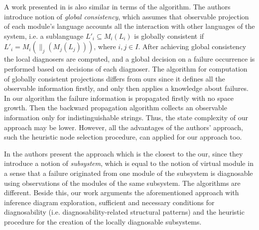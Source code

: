 A work presented in \cite{su_global_2005} is also similar in terms of the
algorithm. The authors introduce notion of \emph{global consistency}, which
assumes that observable projection of each module's language accounts all the
interaction with other languages of the system, i.e. a sublanguage 
$L'_i \subseteq M_i(L_i)$ is globally consistent if 
$L'_i = M_i(\parallel_j(M_j(L_j)))$, where $i, j \in I$. After achieving global
consistency the local diagnosers are computed, and a global decision on a
failure occurrence is performed based on decisions of each diagnoser. The
algorithm for computation of globally consistent projections differs from ours
since it defines all the observable information firstly, and only then
applies a knowledge about failures. In our algorithm the failure information is
propagated firstly with no space growth. Then the backward propagation algorithm
collects an observable information only for indistinguishable strings. Thus, the
state complexity of our approach may be lower. However, all the advantages of
the authors' approach, such the heuristic node selection procedure, can applied
for our approach too.

In \cite{pencole_diagnosability_2004} the authors present the approach which is
the closest to the our, since they introduce a notion of \emph{subsystem}, which
is equal to the notion of virtual module in a sense that a failure originated
from one module of the subsystem is diagnosable using observations of the
modules of the same subsystem. The algorithms are different. Beside this, our
work arguments the aforementioned approach with inference diagram exploration,
sufficient and necessary conditions for diagnosability (i.e.
diagnosability-related structural patterns) and the heuristic procedure for
the creation of the locally diagnosable subsystems.
